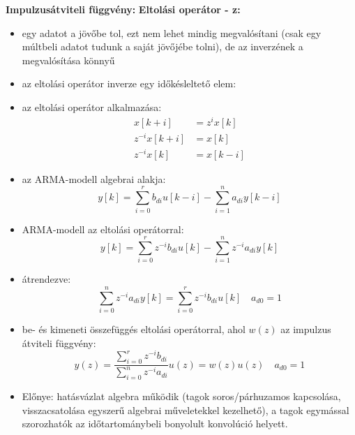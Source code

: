 \textbf{Impulzusátviteli függvény:}
\noindent \textbf{Eltolási operátor - z:}
\begin{itemize}
    \item egy adatot a jövőbe tol, ezt nem lehet mindig megvalósítani (csak egy múltbeli adatot tudunk a saját jövőjébe tolni), de az inverzének a megvalósítása könnyű
    \item az eltolási operátor inverze egy időkésleltető elem:
    \begin{figure}[H]
        \centering
    \end{figure}
    \item az eltolási operátor alkalmazása:
    \begin{align*}
        x[k+i] &= z^i x[k] \\
        z^{-i} x[k+i] &= x[k] \\
        z^{-i} x[k] &= x[k-i]
    \end{align*}
    \item az ARMA-modell algebrai alakja:
    $$ y[k] = \sum_{i=0}^{r} b_{di} u[k-i] - \sum_{i=1}^{n} a_{di} y[k-i] $$
    \item ARMA-modell az eltolási operátorral:
    $$ y[k] = \sum_{i=0}^{r} z^{-i} b_{di} u[k] - \sum_{i=1}^{n} z^{-i} a_{di} y[k] $$
    \item átrendezve:
    $$ \sum_{i=0}^{n} z^{-i} a_{di} y[k] = \sum_{i=0}^{r} z^{-i} b_{di} u[k] \quad a_{d0}=1 $$
    \item be- és kimeneti összefüggés eltolási operátorral, ahol $w(z)$ az impulzus átviteli függvény:
    $$ y(z) = \frac{\sum_{i=0}^{r} z^{-i} b_{di}}{\sum_{i=0}^{n} z^{-i} a_{di}} u(z) = w(z) u(z) \quad a_{d0}=1 $$
    \item Előnye: hatásvázlat algebra működik (tagok soros/párhuzamos kapcsolása, visszacsatolása egyszerű algebrai műveletekkel kezelhető), a tagok egymással szorozhatók az időtartománybeli bonyolult konvolúció helyett.
\end{itemize}
